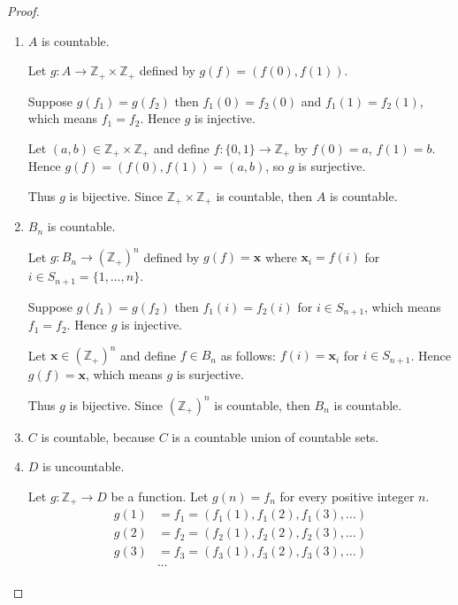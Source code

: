 \begin{proof}
    \begin{enumerate}[label={(\alph*)}]
        \item $A$ is countable.

              Let $g: A\to \mathbb{Z}_{+}\times\mathbb{Z}_{+}$ defined by $g(f) = (f(0), f(1))$.

              Suppose $g(f_{1}) = g(f_{2})$ then $f_{1}(0) = f_{2}(0)$ and $f_{1}(1) = f_{2}(1)$, which means $f_{1} = f_{2}$. Hence $g$ is injective.

              Let $(a, b)\in \mathbb{Z}_{+}\times\mathbb{Z}_{+}$ and define $f: \{ 0, 1 \}\to \mathbb{Z}_{+}$ by $f(0) = a$, $f(1) = b$. Hence $g(f) = (f(0), f(1)) = (a, b)$, so $g$ is surjective.

              Thus $g$ is bijective. Since $\mathbb{Z}_{+}\times\mathbb{Z}_{+}$ is countable, then $A$ is countable.
        \item $B_{n}$ is countable.

              Let $g: B_{n}\to {(\mathbb{Z}_{+})}^{n}$ defined by $g(f) = \mathbf{x}$ where $\mathbf{x}_{i} = f(i)$ for $i\in S_{n+1} = \{ 1, \ldots, n \}$.

              Suppose $g(f_{1}) = g(f_{2})$ then $f_{1}(i) = f_{2}(i)$ for $i\in S_{n+1}$, which means $f_{1} = f_{2}$. Hence $g$ is injective.

              Let $\mathbf{x}\in {(\mathbb{Z}_{+})}^{n}$ and define $f\in B_{n}$ as follows: $f(i) = \mathbf{x}_{i}$ for $i\in S_{n+1}$. Hence $g(f) = \mathbf{x}$, which means $g$ is surjective.

              Thus $g$ is bijective. Since ${(\mathbb{Z}_{+})}^{n}$ is countable, then $B_{n}$ is countable.
        \item $C$ is countable, because $C$ is a countable union of countable sets.
        \item $D$ is uncountable.

              Let $g: \mathbb{Z}_{+}\to D$ be a function. Let $g(n) = f_{n}$ for every positive integer $n$.
              \begin{align*}
                  g(1) & = f_{1} = (f_{1}(1), f_{1}(2), f_{1}(3), \ldots) \\
                  g(2) & = f_{2} = (f_{2}(1), f_{2}(2), f_{2}(3), \ldots) \\
                  g(3) & = f_{3} = (f_{3}(1), f_{3}(2), f_{3}(3), \ldots) \\
                       & \cdots
              \end{align*}


\end{enumerate}
\end{proof}
